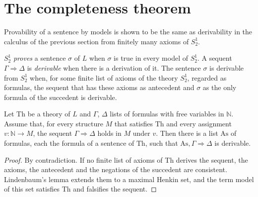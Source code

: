 \section{The completeness theorem}
\label{sec:arithmetic-completeness}

Provability of a sentence by models is shown to be the same as derivability in the calculus of the
previous section from finitely many axioms of $S^1_2$.

\begin{definition}
  \label{def:arithmetic-proves}
  \leanok
  \own{}
  \infrastructure{}
  $S^1_2$ \emph{proves} a sentence $\sigma$ of $L$ when $\sigma$ is true in every model of $S^1_2$. A
  sequent $\Gamma \Rightarrow \Delta$ is \emph{derivable} when there is a derivation of it. The
  sentence $\sigma$ is derivable from $S^1_2$ when, for some finite list of axioms of the theory
  $S^1_2$, regarded as formulas, the sequent that has these axioms as antecedent and $\sigma$ as
  the only formula of the succedent is derivable.
\end{definition}

\begin{theorem}
  \label{thm:arithmetic-completeness-theory}
  \leanok
  Let $\mathrm{Th}$ be a theory of $L$ and $\Gamma$, $\Delta$ lists of formulas with free variables in
  $\mathbb{N}$. Assume that, for every structure $M$ that satisfies $\mathrm{Th}$ and every
  assignment $v : \mathbb{N} \to M$, the sequent $\Gamma \Rightarrow \Delta$ holds in $M$ under
  $v$. Then there is a list $\mathrm{As}$ of formulas, each the formula of a sentence of
  $\mathrm{Th}$, such that $\mathrm{As}, \Gamma \Rightarrow \Delta$ is derivable.
\end{theorem}

\begin{proof}
  \leanok
  By contradiction. If no finite list of axioms of $\mathrm{Th}$ derives the sequent, the axioms, the
  antecedent and the negations of the succedent are consistent. Lindenbaum's lemma extends them to a
  maximal Henkin set, and the term model of this set satisfies $\mathrm{Th}$ and falsifies the
  sequent.
\end{proof}

